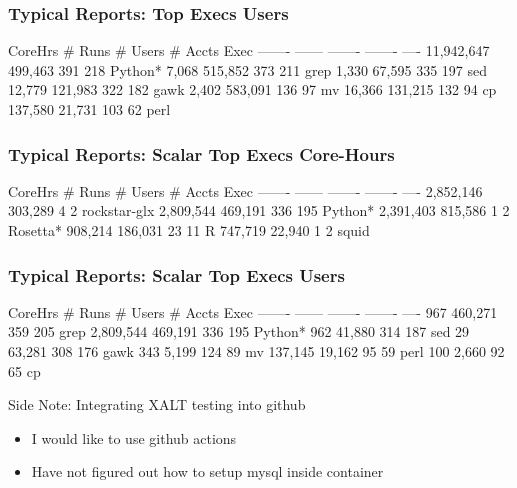 \documentclass{beamer}
\begin{document}
\begin{frame}[fragile]
    \frametitle{Typical Reports: Top Execs Users}
 {\small
    \begin{semiverbatim}
   CoreHrs   # Runs  # Users  # Accts  Exec
   -------   ------  -------  -------  ----
11,942,647  499,463      391      218  Python*
     7,068  515,852      373      211  grep
     1,330   67,595      335      197  sed
    12,779  121,983      322      182  gawk
     2,402  583,091      136       97  mv
    16,366  131,215      132       94  cp
   137,580   21,731      103       62  perl
    \end{semiverbatim}
}
\end{frame}

\begin{frame}[fragile]
    \frametitle{Typical Reports: Scalar Top Execs Core-Hours}
 {\small
    \begin{semiverbatim}
  CoreHrs   # Runs  # Users  # Accts  Exec
  -------   ------  -------  -------  ----
2,852,146  303,289        4        2  rockstar-glx
2,809,544  469,191      336      195  Python*
2,391,403  815,586        1        2  Rosetta*
  908,214  186,031       23       11  R
  747,719   22,940        1        2  squid
    \end{semiverbatim}
}
\end{frame}

\begin{frame}[fragile]
    \frametitle{Typical Reports: Scalar Top Execs Users}
 {\small
    \begin{semiverbatim}
  CoreHrs   # Runs  # Users  # Accts  Exec
  -------   ------  -------  -------  ----
      967  460,271      359      205  grep
2,809,544  469,191      336      195  Python*
      962   41,880      314      187  sed
       29   63,281      308      176  gawk
      343    5,199      124       89  mv
  137,145   19,162       95       59  perl
      100    2,660       92       65  cp
    \end{semiverbatim}
}
\end{frame}

\begin{frame}{Side Note: Integrating XALT testing into github}
  \begin{itemize}
    \item I would like to use github actions
    \item Have not figured out how to setup mysql inside container
  \end{itemize}
\end{frame}
\end{document}
